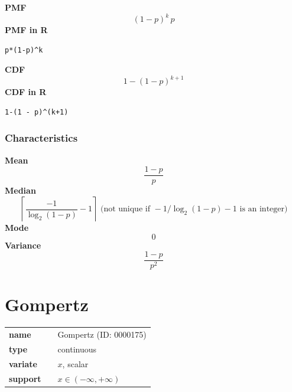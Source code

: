 \smallskip \noindent \hspace{.2cm} \textbf{PMF} 
\begin{equation*}(1 - p)^k\,p\end{equation*}
\smallskip \noindent \hspace{.2cm} \textbf{PMF in R}  
\begin{verbatim}p*(1-p)^k\end{verbatim}
\smallskip \noindent \hspace{.2cm} \textbf{CDF} 
\begin{equation*}1-(1 - p)^{k+1}\end{equation*}
\smallskip \noindent \hspace{.2cm} \textbf{CDF in R} 
\begin{verbatim}1-(1 - p)^(k+1)\end{verbatim}
\smallskip
\subsubsection*{Characteristics}
\smallskip \noindent \hspace{.2cm} \textbf{Mean} 
\begin{equation*}\frac{1-p}{p}\end{equation*}
\smallskip \noindent \hspace{.2cm} \textbf{Median} 
\begin{equation*}\left\lceil \frac{-1}{\log_2(1-p)}-1 \right\rceil \text{ (not unique if } -1/\log_2(1-p)-1 \text{ is an integer)}\end{equation*}
\smallskip \noindent \hspace{.2cm} \textbf{Mode} 
\begin{equation*}0\end{equation*}
\smallskip \noindent \hspace{.2cm} \textbf{Variance} 
\begin{equation*}\frac{1-p}{p^2}\end{equation*}
\smallskip
\section*{Gompertz} 

  \bigskip 

\begin{tabular}{p{2cm}cl}
\textbf{name} & & Gompertz (ID: 0000175)\\ 
 
\textbf{type} & & continuous \\ 

\textbf{variate} & & $x$, scalar \\ 

\textbf{support} & & $x \in (-\infty,+\infty)$
\end{tabular}

